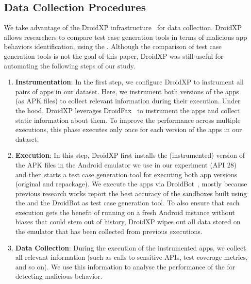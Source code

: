 

\subsection{Data Collection Procedures} \label{sec:dataCollectionProc}

We take advantage of the DroidXP infrastructure~\cite{DBLP:conf/scam/CostaMCMVBC20}
for data collection. DroidXP allows researchers to compare 
test case generation tools in terms of malicious app behaviors identification, using the \mas. Although the comparison of test
case generation tools is not the goal of this paper, DroidXP
was still useful for automating the following steps of our study.


\begin{enumerate}[S1]
 \item \textbf{Instrumentation}: In the first step,
we configure DroidXP to instrument all pairs of apps in our dataset.
Here, we instrument both versions of the apps (as APK files) to collect relevant information during their execution. Under the hood, DroidXP leverages
DroidFax~\cite{DBLP:conf/icsm/CaiR17a} to instrument the apps and collect static
information about them. To improve the performance across multiple executions,
this phase executes only once for each version of the apps in our dataset.

\item \textbf{Execution}: In this step, DroidXP first installs the (instrumented) version of the APK files in the Android emulator we use in our experiment (API 28) and then starts a test case generation tool for executing both app versions (original and repackage). We execute the apps via DroidBot~\cite{DBLP:conf/icse/LiYGC17}, mostly because previous research works report the best accuracy of the sandboxes built using the \mas and the DroidBot as test case generation tool. To also ensure that each execution gets the benefit of running on a fresh Android instance without biases that could stem out of history, DroidXP wipes out all data stored on the emulator that has been collected from previous executions.


\item \textbf{Data Collection}: During the execution of the instrumented apps, we collect all relevant information (such as calls to sensitive APIs, test coverage metrics, and so on). We use this information to analyse the performance of the \mas for detecting malicious behavior.
\end{enumerate}

